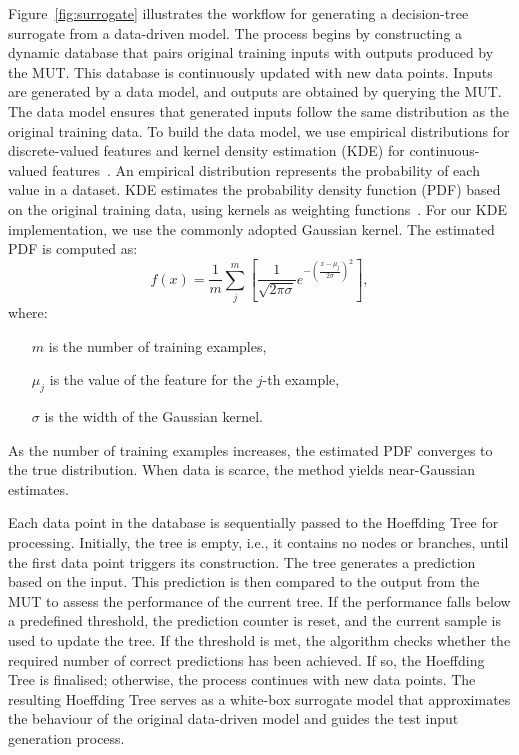 \documentclass[
]{ceurart}
\theoremstyle{definition}
\begin{document}
Figure~\ref{fig:surrogate} illustrates the workflow for generating a decision-tree surrogate from a data-driven model. The process begins by constructing a dynamic database that pairs original training inputs with outputs produced by the MUT. This database is continuously updated with new data points. Inputs are generated by a data model, and outputs are obtained by querying the MUT. The data model ensures that generated inputs follow the same distribution as the original training data. To build the data model, we use empirical distributions for discrete-valued features and kernel density estimation (KDE) for continuous-valued features~\cite{dectext}. An empirical distribution represents the probability of each value in a dataset. KDE estimates the probability density function (PDF) based on the original training data, using kernels as weighting functions~\cite{kde}. For our KDE implementation, we use the commonly adopted Gaussian kernel. The estimated PDF is computed as:
\begin{equation}
f(x) = \frac{1}{m}\sum^m_j\left[ \frac{1}{\sqrt{2\pi\sigma}}e^{-\left(\frac{x-\mu_j}{2\sigma}\right)^2} \right] ,
\end{equation}
where:
\begin{itemize}
\setlength{\itemindent}{1em}
\item[$m$] \hspace*{0.5em}is the number of training examples,
\item[$\mu_j$] \hspace*{0.5em}is the value of the feature for the $j$-th example,
\item[$\sigma$] \hspace*{0.5em}is the width of the Gaussian kernel.
\end{itemize}
As the number of training examples increases, the estimated PDF converges to the true distribution. When data is scarce, the method yields near-Gaussian estimates.

Each data point in the database is sequentially passed to the Hoeffding Tree for processing. Initially, the tree is empty, i.e., it contains no nodes or branches, until the first data point triggers its construction. The tree generates a prediction based on the input. This prediction is then compared to the output from the MUT to assess the performance of the current tree. If the performance falls below a predefined threshold, the prediction counter is reset, and the current sample is used to update the tree. If the threshold is met, the algorithm checks whether the required number of correct predictions has been achieved. If so, the Hoeffding Tree is finalised; otherwise, the process continues with new data points. The resulting Hoeffding Tree serves as a white-box surrogate model that approximates the behaviour of the original data-driven model and guides the test input generation process.
\end{document}
